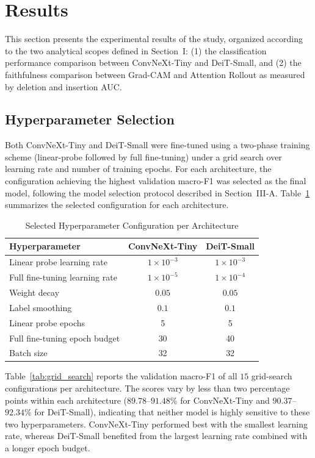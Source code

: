 \section{Results}

This section presents the experimental results of the study, organized according to the two analytical scopes defined in Section~I: (1) the classification performance comparison between ConvNeXt-Tiny and DeiT-Small, and (2) the faithfulness comparison between Grad-CAM and Attention Rollout as measured by deletion and insertion AUC.

\subsection{Hyperparameter Selection}

Both ConvNeXt-Tiny and DeiT-Small were fine-tuned using a two-phase training scheme (linear-probe followed by full fine-tuning) under a grid search over learning rate and number of training epochs.
For each architecture, the configuration achieving the highest validation macro-F1 was selected as the final model, following the model selection protocol described in Section~III-A.
Table~\ref{tab:hyperparam_selection} summarizes the selected configuration for each architecture.

\begin{table}[htbp]
\caption{Selected Hyperparameter Configuration per Architecture}
\label{tab:hyperparam_selection}
\centering
\begin{tabular*}{\columnwidth}{@{\extracolsep{\fill}}lcc@{}}
\toprule
\textbf{Hyperparameter} & \textbf{ConvNeXt-Tiny} & \textbf{DeiT-Small} \\
\midrule
Linear probe learning rate & $1\times10^{-3}$ & $1\times10^{-3}$ \\
Full fine-tuning learning rate & $1\times10^{-5}$ & $1\times10^{-4}$ \\
Weight decay & $0.05$ & $0.05$ \\
Label smoothing & $0.1$ & $0.1$ \\
Linear probe epochs & 5 & 5 \\
Full fine-tuning epoch budget & 30 & 40 \\
Batch size & 32 & 32 \\
\bottomrule
\end{tabular*}
\end{table}

Table~\ref{tab:grid_search} reports the validation macro-F1 of all $15$ grid-search configurations per architecture.
The scores vary by less than two percentage points within each architecture ($89.78$--$91.48\%$ for ConvNeXt-Tiny and $90.37$--$92.34\%$ for DeiT-Small), indicating that neither model is highly sensitive to these two hyperparameters.
ConvNeXt-Tiny performed best with the smallest learning rate, whereas DeiT-Small benefited from the largest learning rate combined with a longer epoch budget.

